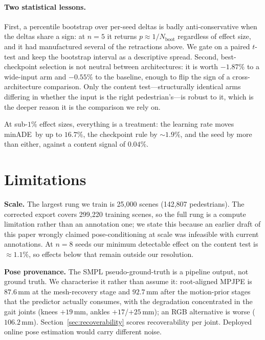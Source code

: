 \documentclass{article} %
\newcommand{\minADE}{minADE\xspace}
\begin{document}
\paragraph{Two statistical lessons.}
First, a percentile bootstrap over per-seed deltas is badly anti-conservative when
the deltas share a sign: at $n{=}5$ it returns $p\approx1/N_{\text{boot}}$
regardless of effect size, and it had manufactured several of the retractions
above. We gate on a paired $t$-test and keep the bootstrap interval as a
descriptive spread. Second, best-checkpoint selection is not neutral between
architectures: it is worth $-1.87\%$ to a wide-input arm and $-0.55\%$ to the
baseline, enough to flip the sign of a cross-architecture comparison. Only the
content test---structurally identical arms differing in whether the input is the
right pedestrian's---is robust to it, which is the deeper reason it is the
comparison we rely on.

At sub-$1\%$ effect sizes, everything is a treatment: the learning rate moves
\minADE\ by up to $16.7\%$, the checkpoint rule by ${\sim}1.9\%$, and the seed by
more than either, against a content signal of $0.04\%$.

\section{Limitations}
\label{sec:limitations}

\textbf{Scale.} The largest rung we train is 25{,}000 scenes (142{,}807
pedestrians). The corrected export covers 299{,}220 training scenes, so the full
rung is a compute limitation rather than an annotation one; we state this because
an earlier draft of this paper wrongly claimed pose-conditioning at scale was
infeasible with current annotations. At $n{=}8$ seeds our minimum detectable
effect on the content test is ${\approx}1.1\%$, so effects below that remain
outside our resolution.

\textbf{Pose provenance.} The SMPL pseudo-ground-truth is a pipeline output, not
ground truth. We characterise it rather than assume it: root-aligned MPJPE is
$87.6$\,mm at the mesh-recovery stage and $92.7$\,mm after the motion-prior
stages that the predictor actually consumes, with the degradation concentrated in
the gait joints (knees $+19$\,mm, ankles $+17$/$+25$\,mm); an RGB alternative is
worse ($106.2$\,mm). Section~\ref{sec:recoverability} scores recoverability per
joint. Deployed online pose estimation would carry different noise.
\end{document}
